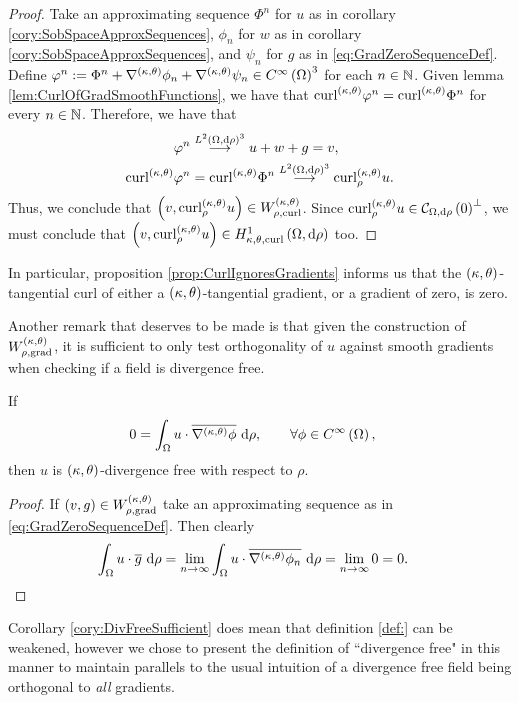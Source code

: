 \begin{proof}
	Take an approximating sequence $\Phi^n$ for $u$ as in corollary \ref{cory:SobSpaceApproxSequences}, $\phi_n$ for $w$ as in  corollary \ref{cory:SobSpaceApproxSequences}, and $\psi_n$ for $g$ as in \eqref{eq:GradZeroSequenceDef}.
	Define $\varphi^n := \Phi^n + \nabla^{\left( \kappa, \theta \right)}\phi_n + \nabla^{\left( \kappa, \theta \right)}\psi_n\in C^{\infty}\left( \Omega \right)^3$ for each $n\in\mathbb{N}$.
	Given lemma \ref{lem:CurlOfGradSmoothFunctions}, we have that $\mathrm{curl}_{}^{\left( \kappa, \theta \right)}\varphi^n = \mathrm{curl}_{}^{\left( \kappa, \theta \right)}\Phi^n$ for every $n\in\mathbb{N}$.
	Therefore, we have that
	\begin{align*}
		\varphi^n &\overset{L^{2}\left( \Omega,\mathrm{d}\rho \right)^3}{\longrightarrow} u + w + g = v, \\
		\mathrm{curl}_{}^{\left( \kappa, \theta \right)}\varphi^n &= \mathrm{curl}_{}^{\left( \kappa, \theta \right)}\Phi^n 
		\overset{L^{2}\left( \Omega,\mathrm{d}\rho \right)^3}{\longrightarrow} \mathrm{curl}_{\rho}^{\left( \kappa, \theta \right)}u.
	\end{align*}
	Thus, we conclude that $\left( v, \mathrm{curl}_{\rho}^{\left( \kappa, \theta \right)}u \right)\in W^{\left( \kappa, \theta \right)}_{\rho, \mathrm{curl}}$.
	Since $\mathrm{curl}_{\rho}^{\left( \kappa, \theta \right)}u\in\mathcal{C}_{ \Omega, \mathrm{d}\rho}\left( 0 \right)^\perp$, we must conclude that $\left(  v, \mathrm{curl}_{\rho}^{\left( \kappa, \theta \right)}u  \right)\in H^1_{\kappa,\theta,\mathrm{curl}}\left( \Omega, \mathrm{d}\rho \right)$ too.
\end{proof}
In particular, proposition \ref{prop:CurlIgnoresGradients} informs us that the $\left( \kappa, \theta \right)$-tangential curl of either a $\left( \kappa, \theta \right)$-tangential gradient, or a gradient of zero, is zero.

Another remark that deserves to be made is that given the construction of $W^{\left( \kappa, \theta \right)}_{\rho,\mathrm{grad}}$, it is sufficient to only test orthogonality of $u$ against smooth gradients when checking if a field is divergence free.
\begin{cory} \label{cory:DivFreeSufficient}
	If
	\begin{align*}
		0 &= \int_{\Omega} u\cdot\overline{\nabla^{\left( \kappa, \theta \right)}\phi}  \ \mathrm{d}\rho, \qquad\forall\phi\in C^{\infty}\left( \Omega \right),
	\end{align*}
	then $u$ is $\left( \kappa, \theta \right)$-divergence free with respect to $\rho$.
\end{cory}
\begin{proof}
	If $\left( v,g \right)\in W^{\left( \kappa, \theta \right)}_{\rho,\mathrm{grad}}$ take an approximating sequence as in \eqref{eq:GradZeroSequenceDef}.
	Then clearly
	\begin{align*}
		\int_{\Omega} u\cdot\overline{g}  \ \mathrm{d}\rho 
		&= \lim_{n\rightarrow\infty}\int_{\Omega} u\cdot\overline{\nabla^{\left( \kappa, \theta \right)}\phi_n}  \ \mathrm{d}\rho
		= \lim_{n\rightarrow\infty} 0 = 0.
	\end{align*}
\end{proof}
Corollary \ref{cory:DivFreeSufficient} does mean that definition \ref{def:} can be weakened, however we chose to present the definition of ``divergence free" in this manner to maintain parallels to the usual intuition of a divergence free field being orthogonal to \emph{all} gradients.